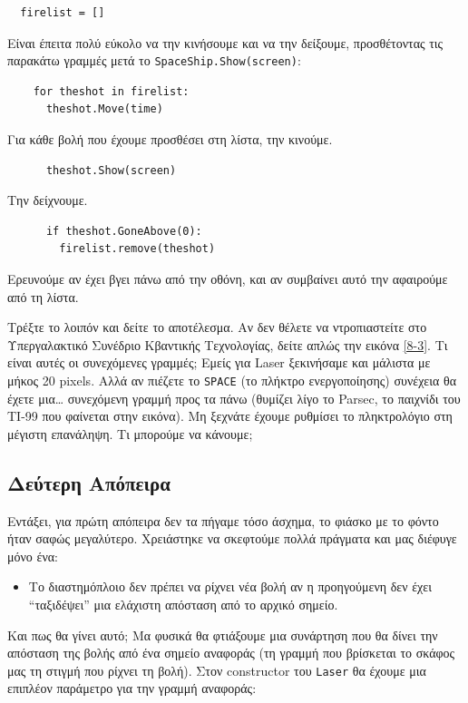 \begin{verbatim}
  firelist = []
\end{verbatim}

Είναι έπειτα πολύ εύκολο να την κινήσουμε και να την δείξουμε, προσθέτοντας τις παρακάτω γραμμές μετά το {\tt SpaceShip.Show(screen)}:

\begin{verbatim}
    for theshot in firelist:
      theshot.Move(time)
\end{verbatim}

Για κάθε βολή που έχουμε προσθέσει στη λίστα, την κινούμε.

\begin{verbatim}
      theshot.Show(screen)
\end{verbatim}

Την δείχνουμε.

\begin{verbatim}
      if theshot.GoneAbove(0):
        firelist.remove(theshot)
\end{verbatim}

Ερευνούμε αν έχει βγει πάνω από την οθόνη, και αν συμβαίνει αυτό την αφαιρούμε από τη λίστα.

Τρέξτε το λοιπόν και δείτε το αποτέλεσμα. Αν δεν θέλετε να ντροπιαστείτε στο Υπεργαλακτικό Συνέδριο Κβαντικής Τεχνολογίας, δείτε απλώς την εικόνα \ref{8-3}. Τι είναι αυτές οι συνεχόμενες γραμμές; Εμείς για Laser ξεκινήσαμε και μάλιστα με μήκος 20 pixels. Αλλά αν πιέζετε το {\tt SPACE} (το πλήκτρο ενεργοποίησης) συνέχεια θα έχετε μια\ldots{} συνεχόμενη γραμμή προς τα πάνω (θυμίζει λίγο το Parsec, το παιχνίδι του TI-99 που φαίνεται στην εικόνα). Μη ξεχνάτε έχουμε ρυθμίσει το πληκτρολόγιο στη μέγιστη επανάληψη. Τι μπορούμε να κάνουμε;
%
\subsection{Δεύτερη Απόπειρα}
%
Εντάξει, για πρώτη απόπειρα δεν τα πήγαμε τόσο άσχημα, το φιάσκο με το φόντο ήταν σαφώς μεγαλύτερο. Χρειάστηκε να σκεφτούμε πολλά πράγματα και μας διέφυγε μόνο ένα:
%
\begin{itemize}
\item Το διαστημόπλοιο δεν πρέπει να ρίχνει νέα βολή αν η προηγούμενη δεν έχει ``ταξιδέψει'' μια ελάχιστη απόσταση από το αρχικό σημείο.
\end{itemize}
%
Και πως θα γίνει αυτό; Μα φυσικά θα φτιάξουμε μια συνάρτηση που θα δίνει την απόσταση της βολής από ένα σημείο αναφοράς (τη γραμμή που βρίσκεται το σκάφος μας τη στιγμή που ρίχνει τη βολή). Στον constructor του {\tt Laser} θα έχουμε μια επιπλέον παράμετρο για την γραμμή αναφοράς:

